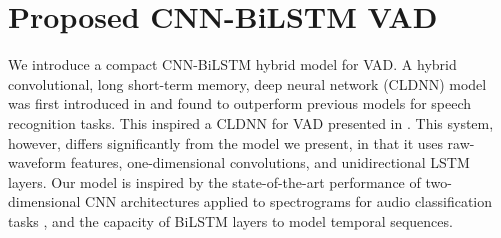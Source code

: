 \documentclass{article}
\begin{document}
\begin{table}
\caption{\textit{AVA-Speech} dataset statistics \cite{AVASpeech}.}
    \label{tab:ava_stats}
    \vspace{-4mm}
\end{table}

\vspace{-2mm}

\section{Proposed CNN-BiLSTM VAD}
\label{sec:system}

\vspace{-2mm}

We introduce a compact CNN-BiLSTM hybrid model for VAD.
A hybrid convolutional, long short-term memory, deep neural network (CLDNN) model was first introduced in \cite{CLDNN} and found to outperform previous models for speech recognition tasks.
This inspired a CLDNN for VAD presented in \cite{CLDNNVAD}.
This system, however, differs significantly from the model we present, in that it uses raw-waveform features, one-dimensional convolutions, and unidirectional LSTM layers.
Our model is inspired by the state-of-the-art performance of two-dimensional CNN architectures applied to spectrograms for audio classification tasks \cite{BigCNN}, and the capacity of BiLSTM layers to model temporal sequences.
\end{document}
